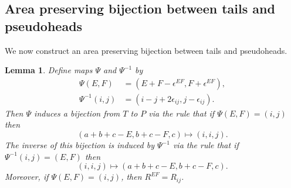 \documentclass[11pt,reqno]{amsart}
\newtheorem{lemma}[theorem]{Lemma}
\theoremstyle{definition}
\numberwithin{equation}{section}
\begin{document}
\subsection{Area preserving bijection between tails and pseudoheads}
\label{section.pseudoheads}
We now construct an area preserving bijection between tails and pseudoheads.
\begin{lemma}
Define maps $\Psi$ and $\Psi^{-1}$ by
\begin{align*}
	 \Psi(E,F)&=(E+F-\epsilon^{EF},F+\epsilon^{EF}),\\
 	\Psi^{-1}(i,j)&=(i-j+2\epsilon_{ij}, j-\epsilon_{ij}).
\end{align*}
Then $\Psi$ induces  a bijection from $T$ to $P$ via the rule that if $\Psi(E,F)=(i,j)$ then 
\[
	(a+b+c-E,b+c-F,c) \mapsto (i,i,j).
\]
The inverse of this bijection is induced by $\Psi^{-1}$  via the rule that if $\Psi^{-1}(i,j)=(E,F)$ then
\[
	(i,i,j) \mapsto (a+b+c-E,b+c-F,c).
\]
Moreover, if $\Psi(E,F)=(i,j)$, then $R^{EF}=R_{ij}$.
\end{lemma}
\end{document}
